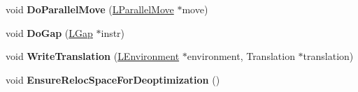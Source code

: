 \begin{DoxyCompactItemize}
\item 
void {\bfseries Do\+Parallel\+Move} (\hyperlink{classv8_1_1internal_1_1_l_parallel_move}{L\+Parallel\+Move} $\ast$move)\hypertarget{classv8_1_1internal_1_1_l_code_gen_ac76d169118f379bb8eb597ec360ca6e1}{}\label{classv8_1_1internal_1_1_l_code_gen_ac76d169118f379bb8eb597ec360ca6e1}

\item 
void {\bfseries Do\+Gap} (\hyperlink{classv8_1_1internal_1_1_l_gap}{L\+Gap} $\ast$instr)\hypertarget{classv8_1_1internal_1_1_l_code_gen_a349f26d8f5d21ea5ef25e7855317a575}{}\label{classv8_1_1internal_1_1_l_code_gen_a349f26d8f5d21ea5ef25e7855317a575}

\item 
void {\bfseries Write\+Translation} (\hyperlink{classv8_1_1internal_1_1_l_environment}{L\+Environment} $\ast$environment, Translation $\ast$translation)\hypertarget{classv8_1_1internal_1_1_l_code_gen_aa6c0dc6868c8926d71543f7d35675b7f}{}\label{classv8_1_1internal_1_1_l_code_gen_aa6c0dc6868c8926d71543f7d35675b7f}

\item 
void {\bfseries Ensure\+Reloc\+Space\+For\+Deoptimization} ()\hypertarget{classv8_1_1internal_1_1_l_code_gen_a9e3268baf80169ef11e1dc8606d6bf7a}{}\label{classv8_1_1internal_1_1_l_code_gen_a9e3268baf80169ef11e1dc8606d6bf7a}

\end{DoxyCompactItemize}
